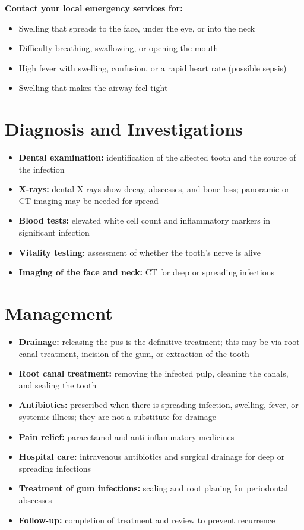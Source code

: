 \textbf{Contact your local emergency services for:}
\begin{itemize}
    \item Swelling that spreads to the face, under the eye, or into the neck
    \item Difficulty breathing, swallowing, or opening the mouth
    \item High fever with swelling, confusion, or a rapid heart rate (possible sepsis)
    \item Swelling that makes the airway feel tight
\end{itemize}

\section*{Diagnosis and Investigations}
\begin{itemize}
    \item \textbf{Dental examination:} identification of the affected tooth and the source of the infection
    \item \textbf{X-rays:} dental X-rays show decay, abscesses, and bone loss; panoramic or CT imaging may be needed for spread
    \item \textbf{Blood tests:} elevated white cell count and inflammatory markers in significant infection
    \item \textbf{Vitality testing:} assessment of whether the tooth's nerve is alive
    \item \textbf{Imaging of the face and neck:} CT for deep or spreading infections
\end{itemize}

\section*{Management}
\begin{itemize}
    \item \textbf{Drainage:} releasing the pus is the definitive treatment; this may be via root canal treatment, incision of the gum, or extraction of the tooth
    \item \textbf{Root canal treatment:} removing the infected pulp, cleaning the canals, and sealing the tooth
    \item \textbf{Antibiotics:} prescribed when there is spreading infection, swelling, fever, or systemic illness; they are not a substitute for drainage
    \item \textbf{Pain relief:} paracetamol and anti-inflammatory medicines
    \item \textbf{Hospital care:} intravenous antibiotics and surgical drainage for deep or spreading infections
    \item \textbf{Treatment of gum infections:} scaling and root planing for periodontal abscesses
    \item \textbf{Follow-up:} completion of treatment and review to prevent recurrence
\end{itemize}

